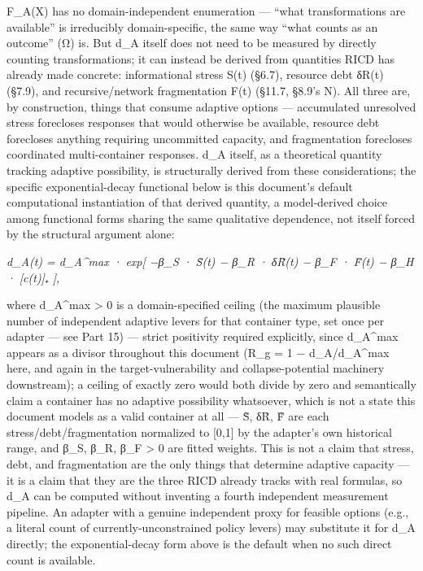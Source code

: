\documentclass[
]{article}
\begin{document}
F\_A(X) has no domain-independent enumeration --- ``what transformations
are available'' is irreducibly domain-specific, the same way ``what
counts as an outcome'' (Ω) is. But d\_A itself does not need to be
measured by directly counting transformations; it can instead be derived
from quantities RICD has already made concrete: informational stress
S(t) (§6.7), resource debt δR(t) (§7.9), and recursive/network
fragmentation F(t) (§11.7, §8.9's N). All three are, by construction,
things that consume adaptive options --- accumulated unresolved stress
forecloses responses that would otherwise be available, resource debt
forecloses anything requiring uncommitted capacity, and fragmentation
forecloses coordinated multi-container responses. d\_A itself, as a
theoretical quantity tracking adaptive possibility, is structurally
derived from these considerations; the specific exponential-decay
functional below is this document's default computational instantiation
of that derived quantity, a model-derived choice among functional forms
sharing the same qualitative dependence, not itself forced by the
structural argument alone:

\emph{d\_A(t) = d\_A\^{}max · exp{[} −β\_S · S̃(t) − β\_R · δR̃(t) − β\_F
· F̃(t) − β\_H · {[}c(t){]}₊ {]},}

where d\_A\^{}max \textgreater{} 0 is a domain-specified ceiling (the
maximum plausible number of independent adaptive levers for that
container type, set once per adapter --- see Part 15) --- strict
positivity required explicitly, since d\_A\^{}max appears as a divisor
throughout this document (R\_g = 1 − d\_A/d\_A\^{}max here, and again in
the target-vulnerability and collapse-potential machinery downstream); a
ceiling of exactly zero would both divide by zero and semantically claim
a container has no adaptive possibility whatsoever, which is not a state
this document models as a valid container at all --- S̃, δR̃, F̃ are each
stress/debt/fragmentation normalized to {[}0,1{]} by the adapter's own
historical range, and β\_S, β\_R, β\_F \textgreater{} 0 are fitted
weights. This is not a claim that stress, debt, and fragmentation are
the only things that determine adaptive capacity --- it is a claim that
they are the three RICD already tracks with real formulas, so d\_A can
be computed without inventing a fourth independent measurement pipeline.
An adapter with a genuine independent proxy for feasible options (e.g.,
a literal count of currently-unconstrained policy levers) may substitute
it for d\_A directly; the exponential-decay form above is the default
when no such direct count is available.
\end{document}
